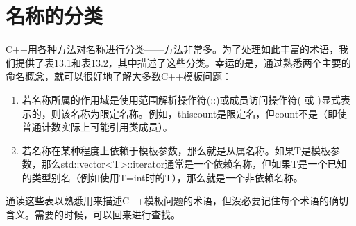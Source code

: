 \section{名称的分类}
C++用各种方法对名称进行分类——方法非常多。为了处理如此丰富的术语，我们提供了表13.1和表13.2，其中描述了这些分类。幸运的是，通过熟悉两个主要的命名概念，就可以很好地了解大多数C++模板问题：

\begin{enumerate}
\item 
若名称所属的作用域是使用范围解析操作符(::)或成员访问操作符( 或 \inlcpp{->})显式表示的，则该名称为限定名称。例如，this\inlcpp{->}count是限定名，但count不是（即使普通计数实际上可能引用类成员）。

\item 
若名称在某种程度上依赖于模板参数，那么就是从属名称。如果T是模板参数，那么std::vector<T>::iterator通常是一个依赖名称，但如果T是一个已知的类型别名（例如使用T=int时的T），那么就是一个非依赖名称。
\end{enumerate}

通读这些表以熟悉用来描述C++模板问题的术语，但没必要记住每个术语的确切含义。需要的时候，可以回来进行查找。

